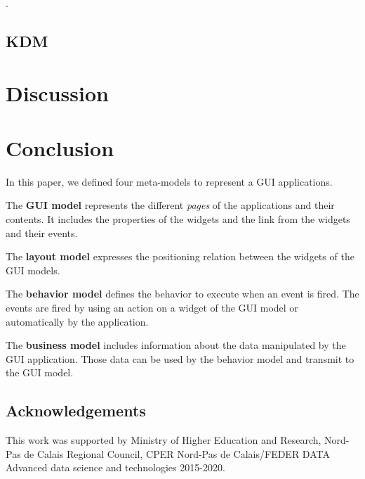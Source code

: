 \documentclass[conference]{IEEEtran}
\begin{document}
\citet{samir2007swing2script}.

\subsection{KDM}
\label{sec:kdm}


\section{Discussion}
\label{sec:discussion}



\section{Conclusion}
\label{sec:conclusion}


In this paper, we defined four meta-models to represent a GUI applications.

The \textbf{GUI model} represents the different \textit{pages} of the applications and their contents.
It includes the properties of the widgets and the link from the widgets and their events.

The \textbf{layout model} expresses the positioning relation between the widgets of the GUI models.

The \textbf{behavior model} defines the behavior to execute when
    an event is fired.
The events are fired by using an action on a widget of the GUI model or
    automatically by the application.

The \textbf{business model} includes information about the data manipulated
    by the GUI application.
Those data can be used by the behavior model and transmit to the
    GUI model.

\subsection*{Acknowledgements} 
This work was supported by Ministry of Higher Education and Research, Nord-Pas de Calais Regional Council, CPER Nord-Pas de Calais/FEDER DATA Advanced data science and technologies 2015-2020.

%


\end{document}
